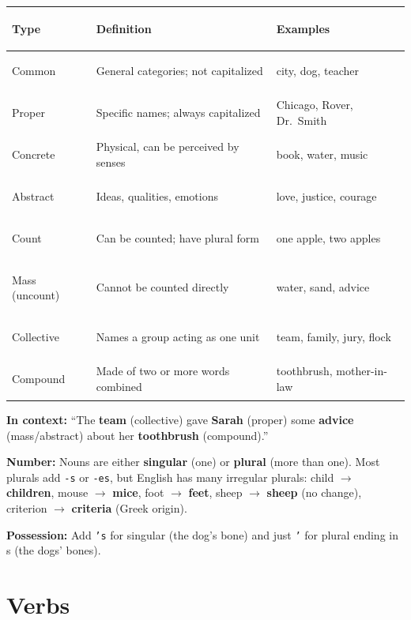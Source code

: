 \documentclass[11pt, letterpaper]{article}
\newcommand{\example}[1]{%
  \begin{tcolorbox}[colback=exbg, colframe=exborder,
    title={\bfseries Example}, arc=3pt, boxrule=1pt]
  #1
  \end{tcolorbox}%
}
\begin{document}
\noindent
{\renewcommand{\arraystretch}{1.5}
\begin{tabularx}{\textwidth}{>{\bfseries\raggedright\arraybackslash}p{3cm}
                              >{\raggedright\arraybackslash}X
                              >{\raggedright\arraybackslash}p{3.5cm}}
\toprule
\rowcolor{tableheader}
\textbf{Type} & \textbf{Definition} & \textbf{Examples} \\
\midrule
\rowcolor{rowA}  Common         & General categories; not capitalized         & city, dog, teacher \\
\rowcolor{rowB}  Proper         & Specific names; always capitalized          & Chicago, Rover, Dr.~Smith \\
\rowcolor{rowA}  Concrete       & Physical, can be perceived by senses        & book, water, music \\
\rowcolor{rowB}  Abstract       & Ideas, qualities, emotions                  & love, justice, courage \\
\rowcolor{rowA}  Count          & Can be counted; have plural form            & one apple, two apples \\
\rowcolor{rowB}  Mass (uncount) & Cannot be counted directly                  & water, sand, advice \\
\rowcolor{rowA}  Collective     & Names a group acting as one unit            & team, family, jury, flock \\
\rowcolor{rowB}  Compound       & Made of two or more words combined          & toothbrush, mother-in-law \\
\bottomrule
\end{tabularx}}

\example{
\textbf{In context:} ``The \textbf{team} (collective) gave \textbf{Sarah} (proper) some
\textbf{advice} (mass/abstract) about her \textbf{toothbrush} (compound).''
}

\textbf{Number:} Nouns are either \textbf{singular} (one) or \textbf{plural} (more than one).
Most plurals add \texttt{-s} or \texttt{-es}, but English has many irregular plurals:
child $\to$ \textbf{children}, mouse $\to$ \textbf{mice}, foot $\to$ \textbf{feet},
sheep $\to$ \textbf{sheep} (no change), criterion $\to$ \textbf{criteria} (Greek origin).

\textbf{Possession:} Add \texttt{'s} for singular (the dog's bone) and just \texttt{'} for plural ending in s (the dogs' bones).

\section*{Verbs}
\end{document}
